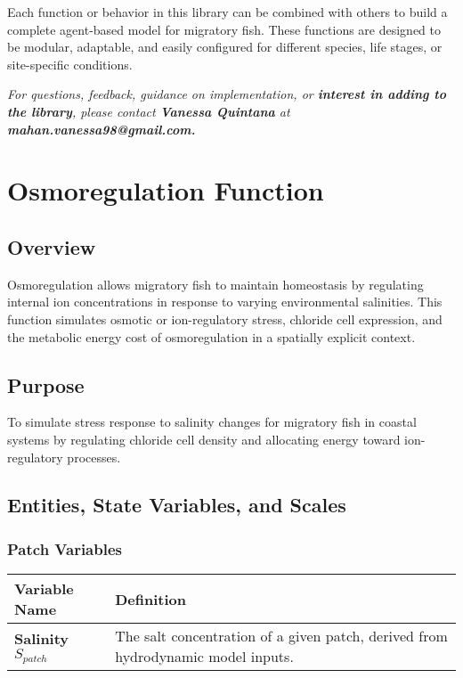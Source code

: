 \documentclass[
]{book}
\begin{document}
Each function or behavior in this library can be combined with others to build a complete agent-based model for migratory fish. These functions are designed to be modular, adaptable, and easily configured for different species, life stages, or site-specific conditions.

\emph{For questions, feedback, guidance on implementation, or \textbf{interest in adding to the library}, please contact \textbf{Vanessa Quintana} at \textbf{mahan.vanessa98@gmail.com.}}

\chapter{Osmoregulation Function}\label{osmoregulation-function}

\section{Overview}\label{overview-1}

Osmoregulation allows migratory fish to maintain homeostasis by regulating internal ion concentrations in response to varying environmental salinities. This function simulates osmotic or ion-regulatory stress, chloride cell expression, and the metabolic energy cost of osmoregulation in a spatially explicit context.

\section{Purpose}\label{purpose}

To simulate stress response to salinity changes for migratory fish in coastal systems by regulating chloride cell density and allocating energy toward ion-regulatory processes.

\section{Entities, State Variables, and Scales}\label{entities-state-variables-and-scales}

\subsection{Patch Variables}\label{patch-variables}

\begin{longtable}[]{@{}
  >{\raggedright\arraybackslash}p{}
  >{\raggedright\arraybackslash}p{}@{}}
\toprule\noalign{}
\begin{minipage}[b]{\linewidth}\raggedright
Variable Name
\end{minipage} & \begin{minipage}[b]{\linewidth}\raggedright
Definition
\end{minipage} \\
\midrule\noalign{}
\endhead
\bottomrule\noalign{}
\endlastfoot
\textbf{Salinity} \(S_{patch}\) & The salt concentration of a given patch, derived from hydrodynamic model inputs. \\
\end{longtable}
\end{document}
